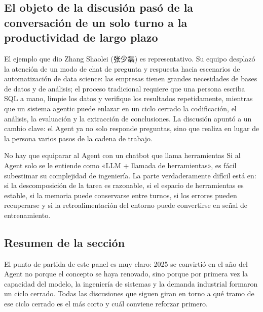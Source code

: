 \subsection{El objeto de la discusión pasó de la conversación de un solo turno a la productividad de largo plazo}
El ejemplo que dio Zhang Shaolei (张少磊) es representativo. Su equipo desplazó la atención de un modo de chat de pregunta y respuesta hacia escenarios de automatización de data science: las empresas tienen grandes necesidades de bases de datos y de análisis; el proceso tradicional requiere que una persona escriba SQL a mano, limpie los datos y verifique los resultados repetidamente, mientras que un sistema agentic puede enlazar en un ciclo cerrado la codificación, el análisis, la evaluación y la extracción de conclusiones. La discusión apuntó a un cambio clave: el Agent ya no solo responde preguntas, sino que realiza en lugar de la persona varios pasos de la cadena de trabajo.

\begin{warningbox}{No hay que equiparar al Agent con un chatbot que llama herramientas}
Si al Agent solo se le entiende como «LLM + llamada de herramientas», es fácil subestimar su complejidad de ingeniería. La parte verdaderamente difícil está en: si la descomposición de la tarea es razonable, si el espacio de herramientas es estable, si la memoria puede conservarse entre turnos, si los errores pueden recuperarse y si la retroalimentación del entorno puede convertirse en señal de entrenamiento.
\end{warningbox}

\subsection{Resumen de la sección}
El punto de partida de este panel es muy claro: 2025 se convirtió en el año del Agent no porque el concepto se haya renovado, sino porque por primera vez la capacidad del modelo, la ingeniería de sistemas y la demanda industrial formaron un ciclo cerrado. Todas las discusiones que siguen giran en torno a qué tramo de ese ciclo cerrado es el más corto y cuál conviene reforzar primero.
